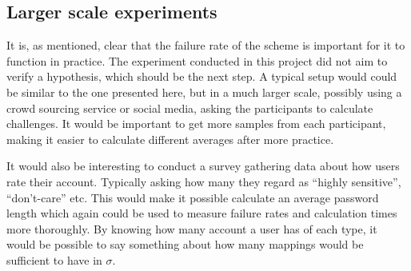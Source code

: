 \subsection{Larger scale experiments}
It is, as mentioned, clear that the failure rate of the scheme is important for it to function in practice. The experiment conducted in this project did not aim to verify a hypothesis, which should be the next step. A typical setup would could be similar to the one presented here, but in a much larger scale, possibly using a crowd sourcing service or social media, asking the participants to calculate challenges. It would be important to get more samples from each participant, making it easier to calculate different averages after more practice.  
\par It would also be interesting to conduct a survey gathering data about how users rate their account. Typically asking how many they regard as ``highly sensitive'', ``don't-care'' etc. This would make it possible calculate an average password length which again could be used to measure failure rates and calculation times more thoroughly. By knowing how many account a user has of each type, it would be possible to say something about how many mappings would be sufficient to have in $\sigma$. 
